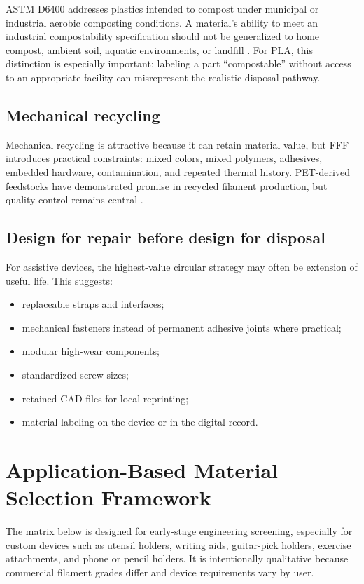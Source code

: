 \documentclass[11pt]{article}
\begin{document}
ASTM D6400 addresses plastics intended to compost under municipal or industrial aerobic composting conditions. A material's ability to meet an industrial compostability specification should not be generalized to home compost, ambient soil, aquatic environments, or landfill \cite{astmd6400}. For PLA, this distinction is especially important: labeling a part ``compostable'' without access to an appropriate facility can misrepresent the realistic disposal pathway.

\subsection{Mechanical recycling}

Mechanical recycling is attractive because it can retain material value, but FFF introduces practical constraints: mixed colors, mixed polymers, adhesives, embedded hardware, contamination, and repeated thermal history. PET-derived feedstocks have demonstrated promise in recycled filament production, but quality control remains central \cite{zander2018}.

\subsection{Design for repair before design for disposal}

For assistive devices, the highest-value circular strategy may often be extension of useful life. This suggests:

\begin{itemize}
  \item replaceable straps and interfaces;
  \item mechanical fasteners instead of permanent adhesive joints where practical;
  \item modular high-wear components;
  \item standardized screw sizes;
  \item retained CAD files for local reprinting;
  \item material labeling on the device or in the digital record.
\end{itemize}

\section{Application-Based Material Selection Framework}

The matrix below is designed for early-stage engineering screening, especially for custom devices such as utensil holders, writing aids, guitar-pick holders, exercise attachments, and phone or pencil holders. It is intentionally qualitative because commercial filament grades differ and device requirements vary by user.
\end{document}
